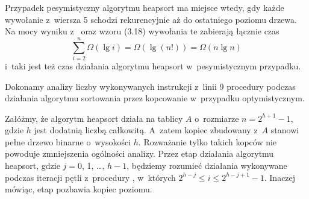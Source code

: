 \exercise %
Przypadek pesymistyczny algorytmu heapsort ma miejsce wtedy, gdy każde wywołanie  z~wiersza 5 schodzi rekurencyjnie aż do ostatniego poziomu drzewa.
Na mocy wyniku z~ oraz wzoru (3.18) wywołania te zabierają łącznie czas
\[
	\sum_{i=2}^n\Omega(\lg i) = \Omega(\lg(n!)) = \Omega(n\lg n)
\]
i~taki jest też czas działania algorytmu heapsort w~pesymistycznym przypadku.

\exercise %
Dokonamy analizy liczby wykonywanych instrukcji z~linii 9 procedury  podczas działania algorytmu sortowania przez kopcowanie w~przypadku optymistycznym.

Załóżmy, że algorytm heapsort działa na tablicy $A$ o~rozmiarze $n=2^{h+1}-1$, gdzie $h$ jest dodatnią liczbą całkowitą.
A~zatem kopiec zbudowany z~$A$ stanowi pełne drzewo binarne o~wysokości $h$.
Rozważanie tylko takich kopców nie powoduje zmniejszenia ogólności analizy.
Przez  etap działania algorytmu heapsort, gdzie $j=0$, 1, \dots, $h-1$, będziemy rozumieć działania wykonywane podczas iteracji pętli  z~procedury , w~których $2^{h-j}\le i\le2^{h-j+1}-1$.
Inaczej mówiąc,  etap pozbawia kopiec  poziomu.

